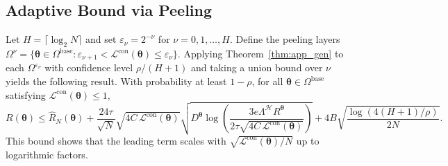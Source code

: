 \documentclass{article}
\theoremstyle{plain}
\theoremstyle{definition}
\theoremstyle{remark}
\begin{document}
	\subsection{Adaptive Bound via Peeling}
	Let $H=\lceil\log_2 N\rceil$ and set $\varepsilon_{\nu}=2^{-\nu}$ for $\nu=0,1,\dots,H$. Define the peeling layers $\Omega^{\nu}=\{\boldsymbol{\theta}\in\Omega^{\mathrm{base}}:\varepsilon_{\nu+1}<\mathcal L^{\mathrm{con}}(\boldsymbol{\theta})\le \varepsilon_{\nu}\}$. Applying Theorem~\ref{thm:app_gen} to each $\Omega^{\varepsilon_{\nu}}$ with confidence level $\rho/(H+1)$ and taking a union bound over $\nu$ yields the following result. With probability at least $1-\rho$, for all $\boldsymbol{\theta}\in\Omega^{\mathrm{base}}$ satisfying $\mathcal L^{\mathrm{con}}(\boldsymbol{\theta})\le 1$,
	\begin{equation*}
		R(\boldsymbol{\theta})
		\le
		\widehat R_{N}(\boldsymbol{\theta})
		+
		\frac{24\tau}{\sqrt N}\sqrt{4C\,\mathcal L^{\mathrm{con}}(\boldsymbol{\theta})}\sqrt{D^{\boldsymbol{\theta}}\log\left(\frac{3e\Lambda^{\mathcal{H}} R^{\boldsymbol{\theta}}}{2\tau\sqrt{4C\,\mathcal L^{\mathrm{con}}(\boldsymbol{\theta})}}\right)}
		+
		4B\sqrt{\frac{\log\left(4(H+1)/\rho\right)}{2N}}.
	\end{equation*}
	This bound shows that the leading term scales with $\sqrt{\mathcal L^{\mathrm{con}}(\boldsymbol{\theta})/N}$ up to logarithmic factors.
\end{document}
